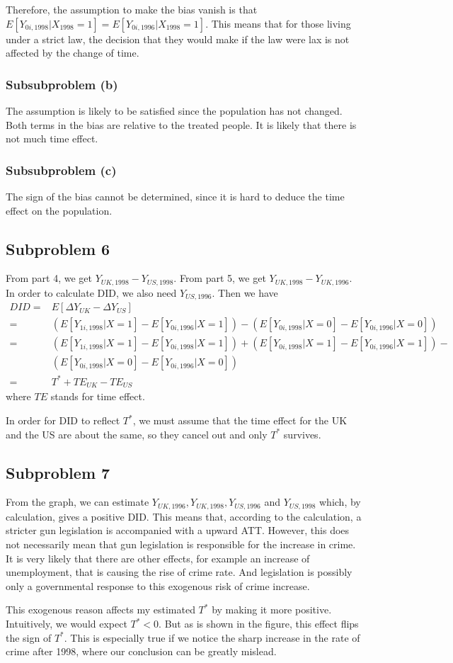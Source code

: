 \documentclass{article}
\begin{document}
Therefore, the assumption to make the bias vanish is that $E[Y_{0i,1998}|X_{1998}=1]=E[Y_{0i,1996}|X_{1998}=1]$. This means that for those living under a strict law, the decision that they would make if the law were lax is not affected by the change of time.

\subsubsection{Subsubproblem (b)}
The assumption is likely to be satisfied since the population has not changed. Both terms in the bias are relative to the treated people. It is likely that there is not much time effect.

\subsubsection{Subsubproblem (c)}
The sign of the bias cannot be determined, since it is hard to deduce the time effect on the population.

\subsection{Subproblem 6}
From part 4, we get $Y_{UK,1998}-Y_{US,1998}$. From part 5, we get $Y_{UK,1998}-Y_{UK,1996}$. In order to calculate DID, we also need $Y_{US,1996}$. Then we have
\begin{align*}
	DID=&E[\Delta Y_{UK}-\Delta Y_{US}]\\
	=&(E[Y_{1i,1998}|X=1]-E[Y_{0i,1996}|X=1])-(E[Y_{0i,1998}|X=0]-E[Y_{0i,1996}|X=0])\\
	=&(E[Y_{1i,1998}|X=1]-E[Y_{0i,1998}|X=1])+(E[Y_{0i,1998}|X=1]-E[Y_{0i,1996}|X=1])-\\
	&(E[Y_{0i,1998}|X=0]-E[Y_{0i,1996}|X=0])\\
	=&T^*+TE_{UK}-TE_{US}
\end{align*}
where $TE$ stands for time effect.

In order for DID to reflect $T^*$, we must assume that the time effect for the UK and the US are about the same, so they cancel out and only $T^*$ survives.

\subsection{Subproblem 7}
From the graph, we can estimate $Y_{UK,1996},Y_{UK,1998},Y_{US,1996}$ and $Y_{US,1998}$ which, by calculation, gives a positive DID. This means that, according to the calculation, a stricter gun legislation is accompanied with a upward ATT. However, this does not necessarily mean that gun legislation is responsible for the increase in crime. It is very likely that there are other effects, for example an increase of unemployment, that is causing the rise of crime rate. And legislation is possibly only a governmental response to this exogenous risk of crime increase.

This exogenous reason affects my estimated $T^*$ by making it more positive. Intuitively, we would expect $T^*<0$. But as is shown in the figure, this effect flips the sign of $T^*$. This is especially true if we notice the sharp increase in the rate of crime after 1998, where our conclusion can be greatly mislead.
\end{document}
